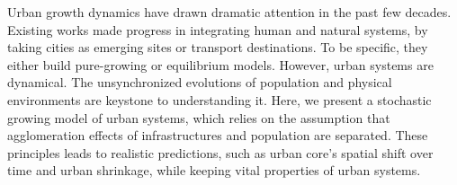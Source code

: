 \documentclass[reprint,unsortedaddress,amsmath,amssymb,aps,prl,showkeys]{revtex4-2}
\begin{document}
Urban growth dynamics have drawn dramatic attention in the past few decades\cite{PhysRevLett.79.523,foster2010communities,PhysRevX.4.011008}. Existing works made progress in integrating human and natural systems, by taking cities as emerging sites or transport destinations\cite{Liu1258832}. To be specific, they either build pure-growing or equilibrium models. However, urban systems are dynamical. The unsynchronized evolutions of population and physical environments are keystone to understanding it\cite{doi:10.1177/0042098010396239,gu2001social}. Here, we present a stochastic growing model of urban systems, which relies on the assumption that agglomeration effects of infrastructures and population are separated. These principles  leads to realistic predictions, such as urban core's spatial shift over time and urban shrinkage, while keeping vital properties\cite{gabaix1999zipf's,clark1951urban} of urban systems. 
\end{document}
